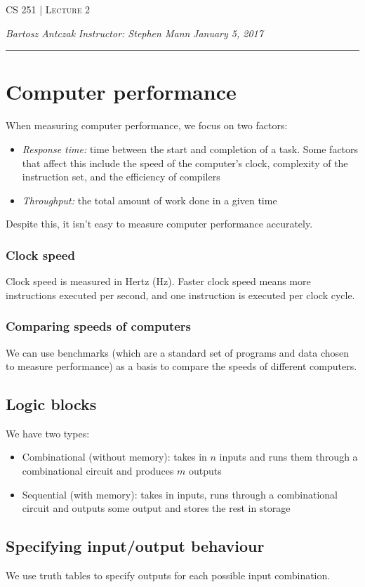 \documentclass{report}
\newcommand{\lectureNum}{2}
\newcommand{\curDate}{January 5, 2017}
\newcommand{\course}{CS 251}
\newcommand{\instructor}{Stephen Mann}
\begin{document}
\begin{center}
\begin{Large}
\textsc{\course{} | Lecture \lectureNum{}}
\end{Large}
\end{center} 
\noindent \textit{Bartosz Antczak} \hfill
\textit{Instructor: \instructor{}} \hfill
\textit{\curDate{}}
\rule{\textwidth}{0.4pt}
\section{Computer performance}
When measuring computer performance, we focus on two factors:
\begin{itemize}
\item \textit{Response time:} time between the start and completion of a task. Some factors that affect this include the speed of the computer's clock, complexity of the instruction set, and the efficiency of compilers
\item \textit{Throughput:} the total amount of work done in a given time
\end{itemize}
Despite this, it isn't easy to measure computer performance accurately.
\subsubsection{Clock speed}
Clock speed is measured in Hertz (Hz). Faster clock speed means more instructions executed per second, and one instruction is executed per clock cycle.
\subsubsection{Comparing speeds of computers}
We can use benchmarks (which are a standard set of programs and data chosen to measure performance) as a basis to compare the speeds of different computers.
\subsection{Logic blocks}
We have two types:
\begin{itemize}
\item Combinational (without memory): takes in $n$ inputs and runs them through a combinational circuit and produces $m$ outputs
\item Sequential (with memory): takes in inputs, runs through a combinational circuit and outputs some output and stores the rest in storage
\end{itemize}
\subsection{Specifying input/output behaviour}
We use truth tables to specify outputs for each possible input combination.
\end{document}
